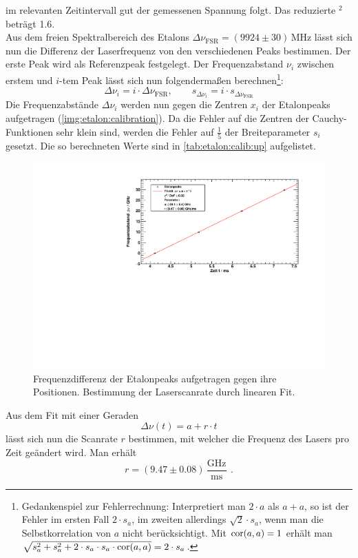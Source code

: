 im relevanten Zeitintervall gut der gemessenen Spannung folgt. Das reduzierte \textchi$^2$ beträgt 1.6. \\
Aus dem freien Spektralbereich des Etalons $\Delta \nu_\text{FSR} = (9924 \pm 30)\,\text{MHz}$ lässt sich nun die Differenz der Laserfrequenz von den verschiedenen
Peaks bestimmen. Der erste Peak wird als Referenzpeak festgelegt. Der Frequenzabstand $\nu_i$ zwischen erstem und $i$-tem Peak lässt sich nun
folgendermaßen berechnen\footnote{Gedankenspiel zur Fehlerrechnung: Interpretiert man $2 \cdot a$ als $a + a$, so ist der Fehler im ersten Fall $2 \cdot s_a$, im zweiten
allerdings $\sqrt{2} \cdot s_a$, wenn man die Selbstkorrelation von $a$ nicht berücksichtigt. Mit $\operatorname{cor}(a, a) = 1$
erhält man $\sqrt{s_a^2 + s_a^2 + 2 \cdot s_a \cdot s_a \cdot \operatorname{cor}(a, a)} = 2 \cdot s_a$.}:
\begin{equation}
    \Delta \nu_i = i \cdot \Delta \nu_\text{FSR}, \qquad s_{\Delta \nu_i} = i \cdot s_{\Delta \nu_\text{FSR}}
\end{equation}
Die Frequenzabstände $\Delta \nu_i$ werden nun gegen die Zentren $x_i$  der
Etalonpeaks aufgetragen (\autoref{img:etalon:calibration}). Da die Fehler auf die Zentren der Cauchy-Funktionen sehr klein sind, werden die Fehler 
auf $\frac{1}{5}$ der Breiteparameter $s_i$ gesetzt. Die so berechneten Werte sind in \autoref{tab:etalon:calib:up} aufgelistet.

\begin{figure}[H]
\begin{center}
    \includegraphics[width=\textwidth]{../img/part2/up-etalon_zoom-etalon_calibration.pdf}
    \caption{Frequenzdifferenz der Etalonpeaks aufgetragen gegen ihre Positionen. Bestimmung der Laserscanrate durch linearen Fit.}
    \label{img:etalon:calibration}
\end{center}
\end{figure}
Aus dem Fit mit einer Geraden
\begin{equation}
    \Delta \nu(t) = a + r \cdot t 
\end{equation}
lässt sich nun die Scanrate $r$ bestimmen, mit welcher die Frequenz des Lasers pro Zeit geändert wird. Man erhält
\begin{equation}
    r = (9.47 \pm 0.08)\,\frac{\text{GHz}}{\text{ms}}\ \, .
\end{equation}

